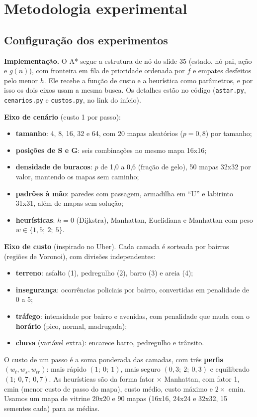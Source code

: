\documentclass[11pt,a4paper]{article}
\begin{document}
\section{Metodologia experimental}

\subsection{Configuração dos experimentos}

\textbf{Implementação.} O A* segue a estrutura de nó do slide 35 (estado, nó pai, ação e $g(n)$), com fronteira em
fila de prioridade ordenada por $f$ e empates desfeitos pelo menor $h$. Ele recebe a função de custo e a heurística
como parâmetros, e por isso os dois eixos usam a mesma busca. Os detalhes estão no código (\texttt{astar.py},
\texttt{cenarios.py} e \texttt{custos.py}, no link do início).

\textbf{Eixo de cenário} (custo 1 por passo):
\begin{itemize}
  \item \textbf{tamanho}: 4, 8, 16, 32 e 64, com 20 mapas aleatórios ($p = 0{,}8$) por tamanho;
  \item \textbf{posições de S e G}: seis combinações no mesmo mapa 16x16;
  \item \textbf{densidade de buracos}: $p$ de 1,0 a 0,6 (fração de gelo), 50 mapas 32x32 por valor, mantendo os mapas
    sem caminho;
  \item \textbf{padrões à mão}: paredes com passagem, armadilha em ``U'' e labirinto 31x31, além de mapas sem solução;
  \item \textbf{heurísticas}: $h = 0$ (Dijkstra), Manhattan, Euclidiana e Manhattan com peso $w \in \{1{,}5;\ 2;\ 5\}$.
\end{itemize}

\textbf{Eixo de custo} (inspirado no Uber). Cada camada é sorteada por bairros (regiões de Voronoi), com divisões
independentes:
\begin{itemize}
  \item \textbf{terreno}: asfalto (1), pedregulho (2), barro (3) e areia (4);
  \item \textbf{insegurança}: ocorrências policiais por bairro, convertidas em penalidade de 0 a 5;
  \item \textbf{tráfego}: intensidade por bairro e avenidas, com penalidade que muda com o \textbf{horário} (pico,
    normal, madrugada);
  \item \textbf{chuva} (variável extra): encarece barro, pedregulho e trânsito.
\end{itemize}
O custo de um passo é a soma ponderada das camadas, com três \textbf{perfis} $(w_t, w_s, w_{tr})$: mais rápido
$(1;\ 0;\ 1)$, mais seguro $(0{,}3;\ 2;\ 0{,}3)$ e equilibrado $(1;\ 0{,}7;\ 0{,}7)$. As heurísticas são da forma
fator $\times$ Manhattan, com fator 1, cmin (menor custo de passo do mapa), custo médio, custo máximo e $2 \times$ cmin.
Usamos um mapa de vitrine 20x20 e 90 mapas (16x16, 24x24 e 32x32, 15 sementes cada) para as médias.
\end{document}
